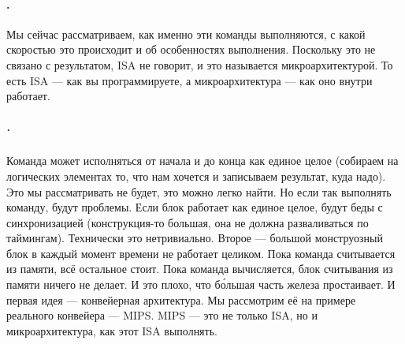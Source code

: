 \documentclass{article}
\begin{document}
    \paragraph{.}
    Мы сейчас рассматриваем, как именно эти команды выполняются, с какой скоростью это происходит и об особенностях выполнения. Поскольку это не связано с результатом, ISA не говорит, и это называется микроархитектурой. То есть ISA --- как вы программируете, а микроархитектура --- как оно внутри работает.
    \subparagraph{.}
    Команда может исполняться от начала и до конца как единое целое (собираем на логических элементах то, что нам хочется и записываем результат, куда надо). Это мы рассматривать не будет, это можно легко найти. Но если так выполнять команду, будут проблемы. Если блок работает как единое целое, будут беды с синхронизацией (конструкция-то большая, она не должна разваливаться по таймингам). Технически это нетривиально. Второе --- большой монструозный блок в каждый момент времени не работает целиком. Пока команда считывается из памяти, всё остальное стоит. Пока команда вычисляется, блок считывания из памяти ничего не делает. И это плохо, что б\'{о}льшая часть железа простаивает. И первая идея --- конвейерная архитектура. Мы рассмотрим её на примере реального конвейера --- MIPS. MIPS --- это не только ISA, но и микроархитектура, как этот ISA выполнять.
    \begin{center}
    \end{center}
\end{document}
